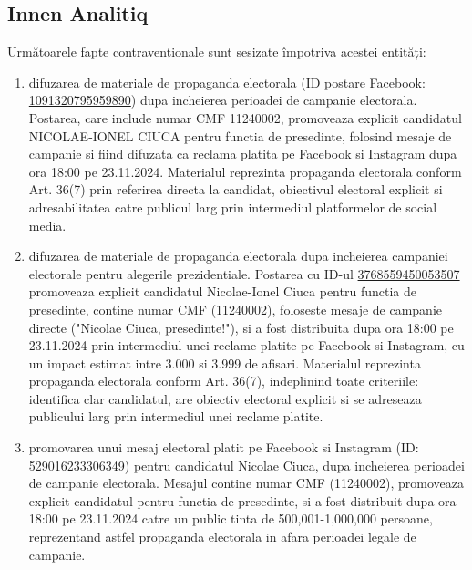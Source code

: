 \documentclass[a4paper,12pt]{article}
\begin{document}
\vspace{0.5cm}

\subsection{Innen Analitiq}
Următoarele fapte contravenționale sunt sesizate împotriva acestei entități:

\begin{enumerate}[leftmargin=*, label=\arabic*.)]
    \item difuzarea de materiale de propaganda electorala (ID postare Facebook: \href{https://www.facebook.com/ads/library/?id=1091320795959890}{1091320795959890}) dupa incheierea perioadei de campanie electorala. Postarea, care include numar CMF 11240002, promoveaza explicit candidatul NICOLAE-IONEL CIUCA pentru functia de presedinte, folosind mesaje de campanie si fiind difuzata ca reclama platita pe Facebook si Instagram dupa ora 18:00 pe 23.11.2024. Materialul reprezinta propaganda electorala conform Art. 36(7) prin referirea directa la candidat, obiectivul electoral explicit si adresabilitatea catre publicul larg prin intermediul platformelor de social media.
    \item difuzarea de materiale de propaganda electorala dupa incheierea campaniei electorale pentru alegerile prezidentiale. Postarea cu ID-ul \href{https://www.facebook.com/ads/library/?id=3768559450053507}{3768559450053507} promoveaza explicit candidatul Nicolae-Ionel Ciuca pentru functia de presedinte, contine numar CMF (11240002), foloseste mesaje de campanie directe ("Nicolae Ciuca, presedinte!"), si a fost distribuita dupa ora 18:00 pe 23.11.2024 prin intermediul unei reclame platite pe Facebook si Instagram, cu un impact estimat intre 3.000 si 3.999 de afisari. Materialul reprezinta propaganda electorala conform Art. 36(7), indeplinind toate criteriile: identifica clar candidatul, are obiectiv electoral explicit si se adreseaza publicului larg prin intermediul unei reclame platite.
    \item promovarea unui mesaj electoral platit pe Facebook si Instagram (ID: \href{https://www.facebook.com/ads/library/?id=529016233306349}{529016233306349}) pentru candidatul Nicolae Ciuca, dupa incheierea perioadei de campanie electorala. Mesajul contine numar CMF (11240002), promoveaza explicit candidatul pentru functia de presedinte, si a fost distribuit dupa ora 18:00 pe 23.11.2024 catre un public tinta de 500,001-1,000,000 persoane, reprezentand astfel propaganda electorala in afara perioadei legale de campanie.
\end{enumerate}
\end{document}
